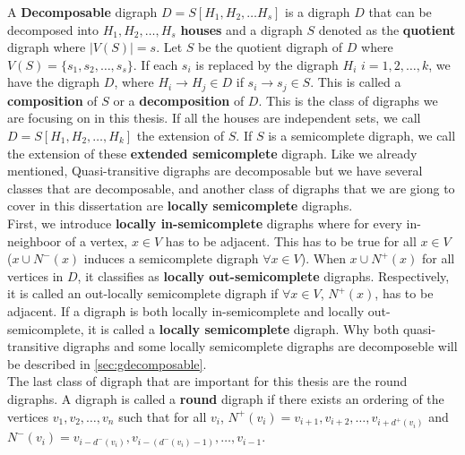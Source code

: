 A \textbf{Decomposable} digraph $D=S[H_1,H_2,\dots H_s]$ is a digraph $D$ that can be decomposed into $H_1,H_2, \dots , H_s$ \textbf{houses} and a digraph $S$ denoted as the \textbf{quotient} digraph where $|V(S)|=s$. 
Let $S$ be the quotient digraph of $D$ where $V(S)=\lbrace s_1,s_2,\dots,s_s\rbrace$. 
If each $s_i$ is replaced by the digraph $H_i$ $i=1,2,\dots,k$, we have the digraph $D$, where $H_i\rightarrow H_j \in D$ if $s_i\rightarrow s_j\in S$. 
This is called a \textbf{composition} of $S$ or a \textbf{decomposition} of $D$.
This is the class of digraphs we are focusing on in this thesis. 
If all the houses are independent sets, we call $D=S[H_1,H_2,\dots ,H_k]$ the extension of $S$. 
If $S$ is a semicomplete digraph, we call the extension of these \textbf{extended semicomplete} digraph.
Like we already mentioned, Quasi-transitive digraphs are decomposable but we have several classes that are decomposable, and another class of digraphs that we are giong to cover in this dissertation are \textbf{locally semicomplete} digraphs.\\
First, we introduce \textbf{locally in-semicomplete} digraphs where for every in-neighboor of a vertex, $x\in V$ has to be adjacent. 
This has to be true for all $x\in V$ ($x\cup N^-(x)$ induces a semicomplete digraph $\forall x\in V$). 
When $x\cup N^+(x)$ for all vertices in $D$, it classifies as \textbf{locally out-semicomplete} digraphs. 
Respectively, it is called an out-locally semicomplete digraph if $\forall x\in V$, $N^+(x)$, has to be adjacent. 
If a digraph is both locally in-semicomplete and locally out-semicomplete, it is called a \textbf{locally semicomplete} digraph. 
Why both quasi-transitive digraphs and some locally semicomplete digraphs are decomposeble will be described in \autoref{sec:gdecomposable}.\\
The last class of digraph that are important for this thesis are the round digraphs. 
A digraph is called a \textbf{round} digraph if there exists an ordering of the vertices $v_1,v_2,\dots,v_n$ such that for all $v_i$, $N^+(v_i)={v_{i+1},v_{i+2},\dots ,v_{i+d^+(v_i)}}$ and $N^-(v_i)={v_{i-d^-(v_i)},v_{i-(d^-(v_i)-1)},\dots ,v_{i-1}}$.




